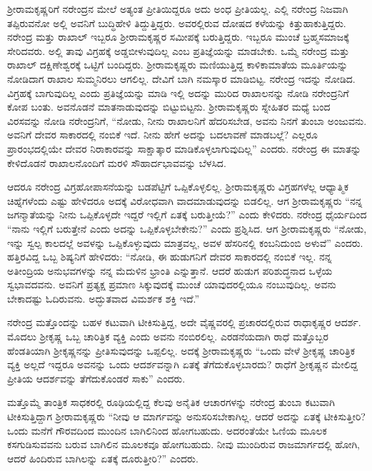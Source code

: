 ಶ‍್ರೀರಾಮಕೃಷ್ಣರಿಗೆ ನರೇಂದ್ರನ ಮೇಲೆ ಅತ್ಯಂತ ಪ್ರೀತಿಯಿದ್ದರೂ ಅದು ಅಂಧ ಪ್ರೀತಿಯಲ್ಲ. ಎಲ್ಲಿ ನರೇಂದ್ರ ನಿಜವಾಗಿ ತಪ್ಪಿರುವನೋ ಅಲ್ಲಿ ಅವನಿಗೆ ಬುದ್ಧಿಹೇಳಿ ತಿದ್ದುತ್ತಿದ್ದರು. ಅವರಲ್ಲಿರುವ ದೋಷದ ಕಳೆಯನ್ನು ಕಿತ್ತುಹಾಕುತ್ತಿದ್ದರು. ನರೇಂದ್ರ ಮತ್ತು ರಾಖಾಲ್ ಇಬ್ಬರೂ ಶ‍್ರೀರಾಮಕೃಷ್ಣರ ಸಮೀಪಕ್ಕೆ ಬರುತ್ತಿದ್ದರು. ಇಬ್ಬರೂ ಮುಂಚೆ ಬ್ರಹ್ಮಸಮಾಜಕ್ಕೆ ಸೇರಿದವರು. ಅಲ್ಲಿ ತಾವು ವಿಗ್ರಹಕ್ಕೆ ಅಡ್ಡಬೀಳುವುದಿಲ್ಲ ಎಂಬ ಪ್ರತಿಜ್ಞೆಯನ್ನು ಮಾಡಬೇಕು. ಒಮ್ಮೆ ನರೇಂದ್ರ ಮತ್ತು ರಾಖಾಲ್ ದಕ್ಷಿಣೇಶ್ವರಕ್ಕೆ ಒಟ್ಟಿಗೆ ಬಂದಿದ್ದರು. ಶ‍್ರೀರಾಮಕೃಷ್ಣರು ಮಣಿಯುತ್ತಿದ್ದ ಕಾಳಿಕಾಮಾತೆಯ ಮೂರ್ತಿಯನ್ನು ನೋಡಿದಾಗ ರಾಖಾಲ ಸುಮ್ಮನಿರಲು ಆಗಲಿಲ್ಲ. ದೇವಿಗೆ ಬಾಗಿ ನಮಸ್ಕಾರ ಮಾಡಿಬಿಟ್ಟ. ನರೇಂದ್ರ ಇದನ್ನು ನೋಡಿದ. ವಿಗ್ರಹಕ್ಕೆ ಬಾಗುವುದಿಲ್ಲ ಎಂದು ಪ್ರತಿಜ್ಞೆಯನ್ನು ಮಾಡಿ ಇಲ್ಲಿ ಅದನ್ನು ಮುರಿದ ರಾಖಾಲನನ್ನು ನೋಡಿ ನರೇಂದ್ರನಿಗೆ ಕೋಪ ಬಂತು. ಅವನೊಡನೆ ಮಾತನಾಡುವುದನ್ನು ಬಿಟ್ಟುಬಿಟ್ಟನು. ಶ‍್ರೀರಾಮಕೃಷ್ಣರು ಸ್ನೇಹಿತರ ಮಧ್ಯೆ ಬಂದ ವಿರಸವನ್ನು ನೋಡಿ ನರೇಂದ್ರನಿಗೆ, “ನೋಡು, ನೀನು ರಾಖಾಲನಿಗೆ ಹೆದರಿಸಬೇಡ, ಅವನು ನಿನಗೆ ತುಂಬಾ ಅಂಜುವನು. ಅವನಿಗೆ ದೇವರ ಸಾಕಾರದಲ್ಲಿ ನಂಬಿಕೆ ಇದೆ. ನೀನು ಹೇಗೆ ಅದನ್ನು ಬದಲಾವಣೆ ಮಾಡಬಲ್ಲೆ? ಎಲ್ಲರೂ ಪ್ರಾರಂಭದಲ್ಲಿಯೇ ದೇವರ ನಿರಾಕಾರವನ್ನು ಸಾಕ್ಷಾತ್ಕಾರ ಮಾಡಿಕೊಳ್ಳಲಾಗುವುದಿಲ್ಲ” ಎಂದರು. ನರೇಂದ್ರ ಈ ಮಾತನ್ನು ಕೇಳಿದೊಡನೆ ರಾಖಾಲನೊಂದಿಗೆ ಮರಳಿ ಸೌಹಾರ್ದಭಾವವನ್ನು ಬೆಳಸಿದ.

ಆದರೂ ನರೇಂದ್ರ ವಿಗ್ರಹೋಪಾಸನೆಯನ್ನು ಬಡಪೆಟ್ಟಿಗೆ ಒಪ್ಪಿಕೊಳ್ಳಲಿಲ್ಲ. ಶ‍್ರೀರಾಮಕೃಷ್ಣರು ವಿಗ್ರಹಗಳೆಲ್ಲ ಆಧ್ಯಾತ್ಮಿಕ ಚಿಹ್ನೆಗಳೆಂದು ಎಷ್ಟು ಹೇಳಿದರೂ ಅದಕ್ಕೆ ವಿರೋಧವಾಗಿ ವಾದಮಾಡುವುದನ್ನು ಬಿಡಲಿಲ್ಲ. ಆಗ ಶ‍್ರೀರಾಮಕೃಷ್ಣರು “ನನ್ನ ಜಗನ್ಮಾತೆಯನ್ನು ನೀನು ಒಪ್ಪಿಕೊಳ್ಳದೇ ಇದ್ದರೆ ಇಲ್ಲಿಗೆ ಏತಕ್ಕೆ ಬರುತ್ತೀಯೆ?” ಎಂದು ಕೇಳಿದರು. ನರೇಂದ್ರ ಧೈರ್ಯದಿಂದ “ನಾನು ಇಲ್ಲಿಗೆ ಬರುತ್ತೇನೆ ಎಂದು ಅದನ್ನು ಒಪ್ಪಿಕೊಳ್ಳಬೇಕೇನು?” ಎಂದು ಪ್ರಶ್ನಿಸಿದ. ಆಗ ಶ‍್ರೀರಾಮಕೃಷ್ಣರು “ನೋಡು, ಇನ್ನು ಸ್ವಲ್ಪ ಕಾಲದಲ್ಲೆ ಅವಳನ್ನು ಒಪ್ಪಿಕೊಳ್ಳುವುದು ಮಾತ್ರವಲ್ಲ, ಅವಳ ಹೆಸರಿನಲ್ಲಿ ಕಂಬನಿದುಂಬಿ ಅಳುವೆ” ಎಂದರು. ಹತ್ತಿರವಿದ್ದ ಒಬ್ಬ ಶಿಷ್ಯನಿಗೆ ಹೇಳಿದರು: “ನೋಡಿ, ಈ ಹುಡುಗನಿಗೆ ದೇವರ ಸಾಕಾರದಲ್ಲಿ ನಂಬಿಕೆ ಇಲ್ಲ. ನನ್ನ ಅತೀಂದ್ರಿಯ ಅನುಭವಗಳನ್ನು ನನ್ನ ಮೆದುಳಿನ ಭ್ರಾಂತಿ ಎನ್ನುತ್ತಾನೆ. ಆದರೆ ಹುಡುಗ ಪರಿಶುದ್ಧನಾದ ಒಳ್ಳೆಯ ಸ್ವಭಾವದವನು. ಅವನಿಗೆ ಪ್ರತ್ಯಕ್ಷ ಪ್ರಮಾಣ ಸಿಕ್ಕುವುದಕ್ಕೆ ಮುಂಚೆ ಯಾವುದರಲ್ಲಿಯೂ ನಂಬುವುದಿಲ್ಲ. ಅವನು ಬೇಕಾದಷ್ಟು ಓದಿರುವನು. ಅದ್ಭುತವಾದ ವಿಮರ್ಶಕ ಶಕ್ತಿ ಇದೆ.”

ನರೇಂದ್ರ ಮತ್ತೊಂದನ್ನು ಬಹಳ ಕಟುವಾಗಿ ಟೀಕಿಸುತ್ತಿದ್ದ, ಅದೇ ವೈಷ್ಣವರಲ್ಲಿ ಪ್ರಚಾರದಲ್ಲಿರುವ ರಾಧಾಕೃಷ್ಣರ ಆದರ್ಶ. ಮೊದಲು ಶ‍್ರೀಕೃಷ್ಣ ಒಬ್ಬ ಚಾರಿತ್ರಿಕ ವ್ಯಕ್ತಿ ಎಂದು ಅವನು ನಂಬಿರಲಿಲ್ಲ. ಎರಡನೆಯದಾಗಿ ರಾಧೆ ಮತ್ತೊಬ್ಬರ ಹೆಂಡತಿಯಾಗಿ ಶ‍್ರೀಕೃಷ್ಣನನ್ನು ಪ್ರೀತಿಸುವುದನ್ನು ಒಪ್ಪಲಿಲ್ಲ. ಅದಕ್ಕೆ ಶ‍್ರೀರಾಮಕೃಷ್ಣರು “ಒಂದು ವೇಳೆ ಶ‍್ರೀಕೃಷ್ಣ ಚಾರಿತ್ರಿಕ ವ್ಯಕ್ತಿ ಅಲ್ಲದೆ ಇದ್ದರೂ ಅವನನ್ನು ಒಂದು ಆದರ್ಶವನ್ನಾಗಿ ಏತಕ್ಕೆ ತೆಗೆದುಕೊಳ್ಳಬಾರದು? ರಾಧೆಗೆ ಶ‍್ರೀಕೃಷ್ಣನ ಮೇಲಿದ್ದ ಪ್ರೀತಿಯ ಆದರ್ಶವನ್ನು ತೆಗೆದುಕೊಂಡರೆ ಸಾಕು” ಎಂದರು.

ಮತ್ತೊಮ್ಮೆ ತಾಂತ್ರಿಕ ಸಾಧಕರಲ್ಲಿ ರೂಢಿಯಲ್ಲಿದ್ದ ಕೆಲವು ಅನೈತಿಕ ಆಚಾರಗಳನ್ನು ನರೇಂದ್ರ ತುಂಬಾ ಕಟುವಾಗಿ ಟೀಕಿಸುತ್ತಿದ್ದಾಗ ಶ‍್ರೀರಾಮಕೃಷ್ಣರು “ನೀವು ಆ ಮಾರ್ಗವನ್ನು ಅನುಸರಿಸಬೇಕಾಗಿಲ್ಲ. ಆದರೆ ಅದನ್ನು ಏತಕ್ಕೆ ಟೀಕಿಸುತ್ತೀರಿ? ಒಂದು ಮನೆಗೆ ಗೌರವದಿಂದ ಮುಂದಿನ ಬಾಗಿಲಿನಿಂದ ಹೋಗಬಹುದು. ಅದರಂತೆಯೇ ಓಣಿಯ ಮೂಲಕ ಕಸಗುಡಿಸುವವನು ಬರುವ ಬಾಗಿಲಿನ ಮೂಲಕವೂ ಹೋಗಬಹುದು. ನೀವು ಮುಂದಿರುವ ರಾಜಮಾರ್ಗದಲ್ಲಿ ಹೋಗಿ, ಆದರೆ ಹಿಂದಿರುವ ಬಾಗಿಲನ್ನು ಏತಕ್ಕೆ ದೂರುತ್ತೀರಿ?” ಎಂದರು.


